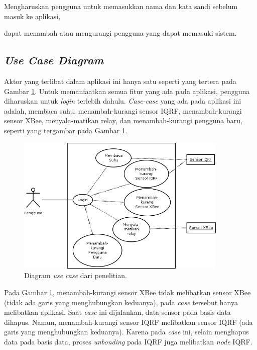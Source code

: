 			\vspace{-0.5cm}
			\begin{itemize}
			\end{itemize}

		\subsection{\emph{Use Case Diagram}}
			Aktor yang terlibat dalam aplikasi ini hanya satu seperti yang tertera pada Gambar \ref{usecase}. Untuk memanfaatkan semua fitur yang ada pada aplikasi, pengguna diharuskan untuk \emph{login} terlebih dahulu. \emph{Case-case} yang ada pada aplikasi ini adalah, membaca suhu, menambah-kurangi sensor IQRF, menambah-kurangi sensor XBee, menyala-matikan relay, dan menambah-kurangi pengguna baru, seperti yang tergambar pada Gambar \ref{usecase}.

				\begin{figure}[H]
				  \centering
				    \includegraphics[width=0.9\textwidth]{gambar/usecase}
				    \caption{Diagram \emph{use case} dari penelitian.}
				    \label{usecase}
				\end{figure}

			Pada Gambar \ref{usecase}, menambah-kurangi sensor XBee tidak melibatkan sensor XBee (tidak ada garis yang menghubungkan keduanya), pada \emph{case} tersebut hanya melibatkan aplikasi. Saat \emph{case} ini dijalankan, data sensor pada basis data dihapus. Namun, menambah-kurangi sensor IQRF melibatkan sensor IQRF (ada garis yang menghubungkan keduanya). Karena pada \emph{case} ini, selain menghapus data pada basis data, proses \emph{unbonding} pada IQRF juga melibatkan \emph{node} IQRF.

